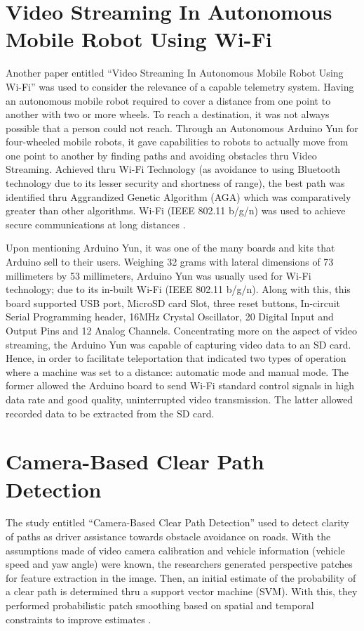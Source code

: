 \section{Video Streaming In Autonomous Mobile Robot Using Wi-Fi}
Another paper entitled “Video Streaming In Autonomous Mobile Robot Using Wi-Fi” was used to consider the relevance of a capable telemetry system. Having an autonomous mobile robot required to cover a distance from one point to another with two or more wheels. To reach a destination, it was not always possible that a person could not reach. Through an Autonomous Arduino Yun for four-wheeled mobile robots, it gave capabilities to robots to actually move from one point to another by finding paths and avoiding obstacles thru Video Streaming. Achieved thru Wi-Fi Technology (as avoidance to using Bluetooth technology due to its lesser security and shortness of range), the best path was identified thru Aggrandized Genetic Algorithm (AGA) which was comparatively greater than other algorithms. Wi-Fi (IEEE 802.11 b/g/n) was used to achieve secure communications at long distances \cite{Saraladevi2015}.
 
Upon mentioning Arduino Yun, it was one of the many boards and kits that Arduino sell to their users. Weighing 32 grams with lateral dimensions of 73 millimeters by 53 millimeters, Arduino Yun was usually used for Wi-Fi technology; due to its in-built Wi-Fi (IEEE 802.11 b/g/n). Along with this, this board supported USB port, MicroSD card Slot, three reset buttons, In-circuit Serial Programming header, 16MHz Crystal Oscillator, 20 Digital Input and Output Pins and 12 Analog Channels. Concentrating more on the aspect of video streaming, the Arduino Yun was capable of capturing video data to an SD card. Hence, in order to facilitate teleportation that indicated two types of operation where a machine was set to a distance: automatic mode and manual mode. The former allowed the Arduino board to send Wi-Fi standard control signals in high data rate and good quality, uninterrupted video transmission. The latter allowed recorded data to be extracted from the SD card.

\section{Camera-Based Clear Path Detection}

The study entitled “Camera-Based Clear Path Detection” used to detect clarity of paths as driver assistance towards obstacle avoidance on roads. With the assumptions made of video camera calibration and vehicle information (vehicle speed and yaw angle) were known, the researchers generated perspective patches for feature extraction in the image. Then, an initial estimate of the probability of a clear path is determined thru a support vector machine (SVM). With this, they performed probabilistic patch smoothing based on spatial and temporal constraints to improve estimates \cite{Wu2010}.
 
